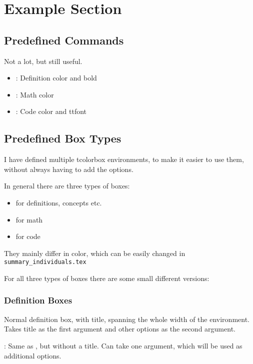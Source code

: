 \documentclass[
../../Summary.tex,
]
{subfiles}
\begin{document}
\section{Example Section}
\subsection{Predefined Commands}
Not a lot, but still useful. 

\begin{itemize}
    \item {}: Definition color and bold
    \item {}: Math color
    \item {}: Code color and ttfont
\end{itemize}

\subsection{Predefined Box Types}
I have defined multiple tcolorbox environments, to make it easier to use them, without always having to add the options.

In general there are three types of boxes:
\begin{itemize}
    \item {} for definitions, concepts etc.
    \item {} for math
    \item {} for code 
\end{itemize}

They mainly differ in color, which can be easily changed in \texttt{summary\_individuals.tex}


For all three types of boxes there are some small different versions:

\subsubsection{Definition Boxes}
\begin{defbox}
    [defbox]
    Normal definition box, with title, spanning the whole width of the environment. Takes title as the first argument and other options as the second argument.
\end{defbox}

\begin{defbox*}
    : Same as , but without a title. Can take one argument, which will be used as additional options.
\end{defbox*}
\end{document}
